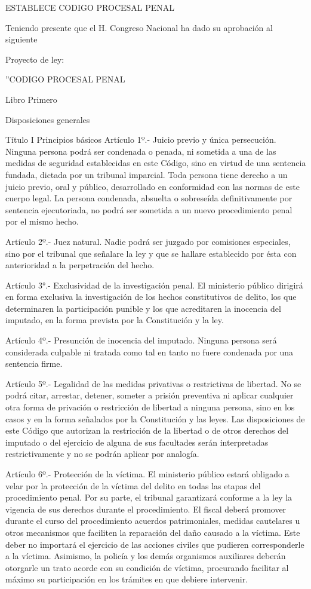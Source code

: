 ESTABLECE CODIGO PROCESAL PENAL

    Teniendo presente que el H. Congreso Nacional ha dado su aprobación al siguiente

    Proyecto de ley:

    ''CODIGO PROCESAL PENAL


    Libro Primero

    Disposiciones generales

    Título I
    Principios básicos
    Artículo 1º.- Juicio previo y única persecución. Ninguna persona podrá ser condenada o penada, ni sometida a una de las medidas de seguridad establecidas en este Código, sino en virtud de una sentencia fundada, dictada por un tribunal imparcial. Toda persona tiene derecho a un juicio previo, oral y público, desarrollado en conformidad con las normas de este cuerpo legal.
    La persona condenada, absuelta o sobreseída definitivamente por sentencia ejecutoriada, no podrá ser sometida a un nuevo procedimiento penal por el mismo hecho.

    Artículo 2º.- Juez natural. Nadie podrá ser juzgado por comisiones especiales, sino por el tribunal que señalare la ley y que se hallare establecido por ésta con anterioridad a la perpetración del hecho.

    Artículo 3°.- Exclusividad de la investigación penal. El ministerio público dirigirá en forma exclusiva la investigación de los hechos constitutivos de delito, los que determinaren la participación punible y los que acreditaren la inocencia del imputado, en la forma prevista por la Constitución y la ley.

    Artículo 4º.- Presunción de inocencia del imputado. Ninguna persona será considerada culpable ni tratada como tal en tanto no fuere condenada por una sentencia firme.

    Artículo 5º.- Legalidad de las medidas privativas o restrictivas de libertad. No se podrá citar, arrestar, detener, someter a prisión preventiva ni aplicar cualquier otra forma de privación o restricción de libertad a ninguna persona, sino en los casos y en la forma señalados por la Constitución y las leyes.
    Las disposiciones de este Código que autorizan la restricción de la libertad o de otros derechos del imputado o del ejercicio de alguna de sus facultades serán interpretadas restrictivamente y no se podrán aplicar por analogía.


    Artículo 6º.- Protección de la víctima. El ministerio público estará obligado a velar por la protección de la víctima del delito en todas las etapas del procedimiento penal. Por su parte, el tribunal garantizará conforme a la ley la vigencia de sus derechos durante el procedimiento.
    El fiscal deberá promover durante el curso del procedimiento acuerdos patrimoniales, medidas cautelares u otros mecanismos que faciliten la reparación del daño causado a la víctima. Este deber no importará el ejercicio de las acciones civiles que pudieren corresponderle a la víctima.
    Asimismo, la policía y los demás organismos auxiliares deberán otorgarle un trato acorde con su condición de víctima, procurando facilitar al máximo su participación en los trámites en que debiere intervenir.


